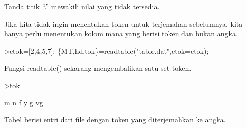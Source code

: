\documentclass[a4paper,10pt]{article}
\begin{document}
\begin{eulernotebook}
\begin{eulercomment}
\begin{eulercomment}
\begin{eulercomment}
\begin{eulercomment}
\begin{eulercomment}
\begin{eulercomment}
\begin{eulercomment}
\begin{eulercomment}
\begin{eulercomment}
\begin{eulercomment}
\begin{eulercomment}
\begin{eulercomment}
\begin{eulercomment}
\begin{eulercomment}
\begin{eulercomment}
\begin{eulercomment}
\begin{eulercomment}
\begin{eulercomment}
\begin{eulercomment}
\begin{eulercomment}
\begin{eulercomment}
\begin{eulercomment}
\begin{eulercomment}
\begin{eulercomment}
\begin{eulercomment}
\begin{eulercomment}
\begin{eulercomment}
\begin{eulercomment}
\begin{eulercomment}
\begin{eulercomment}
\begin{eulercomment}
\begin{eulercomment}
\begin{eulercomment}
\begin{eulercomment}
\begin{eulercomment}
\begin{eulercomment}
\begin{eulercomment}
\begin{eulercomment}
\begin{eulercomment}
\begin{eulercomment}
\begin{eulercomment}
\begin{eulercomment}
\begin{eulercomment}
\begin{eulercomment}
\begin{eulercomment}
Tanda titik “.” mewakili nilai yang tidak tersedia.

Jika kita tidak ingin menentukan token untuk terjemahan sebelumnya,
kita hanya perlu menentukan kolom mana yang berisi token dan bukan
angka.
\end{eulercomment}
\begin{eulerprompt}
>ctok=[2,4,5,7]; \{MT,hd,tok\}=readtable("table.dat",ctok=ctok);
\end{eulerprompt}
\begin{eulercomment}
Fungsi readtable() sekarang mengembalikan satu set token.
\end{eulercomment}
\begin{eulerprompt}
>tok
\end{eulerprompt}
\begin{euleroutput}
  m
  n
  f
  y
  g
  vg
\end{euleroutput}
\begin{eulercomment}
Tabel berisi entri dari file dengan token yang diterjemahkan ke angka.


\end{eulercomment}
\end{eulercomment}
\end{eulercomment}
\end{eulercomment}
\end{eulercomment}
\end{eulercomment}
\end{eulercomment}
\end{eulercomment}
\end{eulercomment}
\end{eulercomment}
\end{eulercomment}
\end{eulercomment}
\end{eulercomment}
\end{eulercomment}
\end{eulercomment}
\end{eulercomment}
\end{eulercomment}
\end{eulercomment}
\end{eulercomment}
\end{eulercomment}
\end{eulercomment}
\end{eulercomment}
\end{eulercomment}
\end{eulercomment}
\end{eulercomment}
\end{eulercomment}
\end{eulercomment}
\end{eulercomment}
\end{eulercomment}
\end{eulercomment}
\end{eulercomment}
\end{eulercomment}
\end{eulercomment}
\end{eulercomment}
\end{eulercomment}
\end{eulercomment}
\end{eulercomment}
\end{eulercomment}
\end{eulercomment}
\end{eulercomment}
\end{eulercomment}
\end{eulercomment}
\end{eulercomment}
\end{eulercomment}
\end{eulercomment}
\end{eulernotebook}
\end{document}

